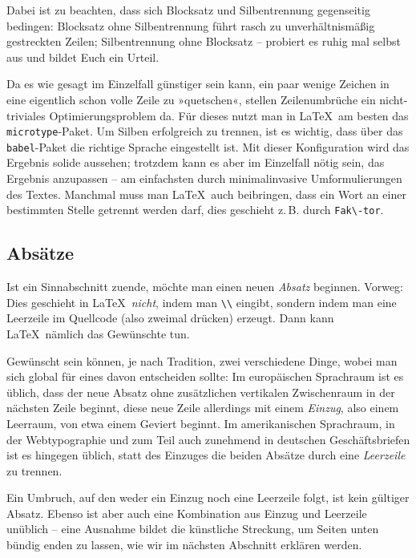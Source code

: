 Dabei ist zu beachten, dass sich Blocksatz und Silbentrennung gegenseitig
bedingen: Blocksatz ohne Silbentrennung führt rasch zu unverhältnismäßig
gestreckten Zeilen; Silbentrennung ohne Blocksatz – probiert es ruhig mal selbst
aus und bildet Euch ein Urteil.

Da es wie gesagt im Einzelfall günstiger sein kann, ein paar wenige Zeichen in
eine eigentlich schon volle Zeile zu »quetschen«, stellen Zeilenumbrüche ein
nicht-triviales Optimierungsproblem da. Für dieses nutzt man in \LaTeX\ am
besten das \verb!microtype!-Paket. Um Silben erfolgreich zu trennen, ist es
wichtig, dass über das \verb!babel!-Paket die richtige Sprache eingestellt ist.
Mit dieser Konfiguration wird das Ergebnis solide aussehen; trotzdem kann es
aber im Einzelfall nötig sein, das Ergebnis anzupassen – am einfachsten durch
minimalinvasive Umformulierungen des Textes. Manchmal muss man \LaTeX\ auch
beibringen, dass ein Wort an einer bestimmten Stelle getrennt werden darf, dies
geschieht z.\,B. durch \verb!Fak\-tor!.

\subsection{Absätze}

Ist ein Sinnabschnitt zuende, möchte man einen neuen \emph{Absatz}
beginnen. Vorweg: Dies geschieht in \LaTeX\ \emph{nicht}, indem man \verb!\\!
eingibt, sondern indem man eine Leerzeile im Quellcode (also zweimal
\keys{\return} drücken) erzeugt. Dann kann \LaTeX\ nämlich das Gewünschte tun.

Gewünscht sein können, je nach Tradition, zwei verschiedene Dinge, wobei man
sich global für eines davon entscheiden sollte: Im europäischen Sprachraum ist
es üblich, dass der neue Absatz ohne zusätzlichen vertikalen Zwischenraum in der
nächsten Zeile beginnt, diese neue Zeile allerdings mit einem \emph{Einzug},
also einem Leerraum, von etwa einem Geviert beginnt. Im amerikanischen
Sprachraum, in der Webtypographie und zum Teil auch zunehmend in deutschen
Geschäftsbriefen ist es hingegen üblich, statt des Einzuges die beiden Absätze
durch eine \emph{Leerzeile} zu trennen.

Ein Umbruch, auf den weder ein Einzug noch eine Leerzeile folgt, ist kein
gültiger Absatz.  Ebenso ist aber auch eine Kombination aus Einzug und Leerzeile
unüblich – eine Ausnahme bildet die künstliche Streckung, um Seiten unten bündig
enden zu lassen, wie wir im nächsten Abschnitt erklären werden.

